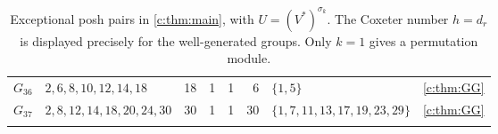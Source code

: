 \documentclass[10pt,a4paper]{amsart}
\theoremstyle{definition}
\begin{document}
\begin{longtable}{@{}lL{.24\textwidth}rrrrL{.26\textwidth}L{.14\textwidth}@{}}
$G_{36}$ & $2,\allowbreak 6,\allowbreak 8,\allowbreak 10,\allowbreak 12,\allowbreak 14,\allowbreak 18$ & 18 & 1 & 1 & 6 & $\{1,\allowbreak 5\}$ & \cref{c:thm:GG} \\
\midrule[.25pt]
$G_{37}$ & $2,\allowbreak 8,\allowbreak 12,\allowbreak 14,\allowbreak 18,\allowbreak 20,\allowbreak 24,\allowbreak 30$ & 30 & 1 & 1 & 30 & $\{1,\allowbreak 7,\allowbreak 11,\allowbreak 13,\allowbreak 17,\allowbreak 19,\allowbreak 23,\allowbreak 29\}$ & \cref{c:thm:GG} \\
\bottomrule
\caption{Exceptional posh pairs in \cref{c:thm:main}, with $U=(V^*)^{\sigma_k}$. The Coxeter number $h=d_r$ is displayed precisely for the well-generated groups. Only $k=1$ gives a permutation module.}\label{c:tab:exceptional}\\
\end{longtable}
\endgroup
\endgroup
\begingroup\small%
\end{document}
